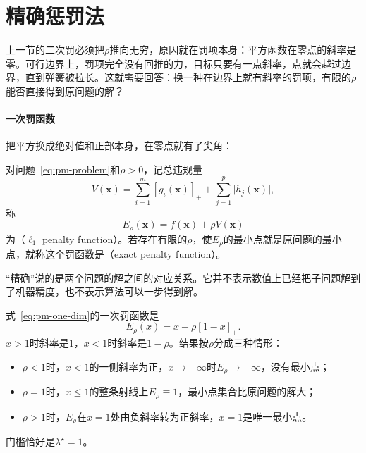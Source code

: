 \section{精确惩罚法}
\label{sec:pm-exact}

上一节的二次罚必须把$\rho$推向无穷，原因就在罚项本身：平方函数在零点的斜率是零。可行边界上，罚项完全没有回推的力，目标只要有一点斜率，点就会越过边界，直到弹簧被拉长。这就需要回答：换一种在边界上就有斜率的罚项，有限的$\rho$能否直接得到原问题的解？

\paragraph{一次罚函数}
把平方换成绝对值和正部本身，在零点就有了尖角：

\begin{definition}[一次罚函数]
\label{def:pm-exact-penalty}
对问题~\eqref{eq:pm-problem}和$\rho>0$，记总违规量
\begin{equation}
 V(\bm{x})=\sum_{i=1}^m[g_i(\bm{x})]_++\sum_{j=1}^p\lvert h_j(\bm{x})\rvert ,
 \label{eq:pm-total-violation}
\end{equation}
称
\begin{equation}
 E_\rho(\bm{x})=f(\bm{x})+\rho V(\bm{x})
 \label{eq:pm-exact-penalty}
\end{equation}
为（$\ell_1$ penalty function）。若存在有限的$\rho$，使$E_\rho$的最小点就是原问题的最小点，就称这个罚函数是（exact penalty function）。
\end{definition}

“精确”说的是两个问题的解之间的对应关系。它并不表示数值上已经把子问题解到了机器精度，也不表示算法可以一步得到解。

\begin{example}[一维例的一次罚]
\label{ex:pm-exact-one-dim}
式~\eqref{eq:pm-one-dim}的一次罚函数是
\[
 E_\rho(x)=x+\rho[1-x]_+ .
\]
$x>1$时斜率是$1$，$x<1$时斜率是$1-\rho$。结果按$\rho$分成三种情形：
\begin{itemize}
 \item $\rho<1$时，$x<1$的一侧斜率为正，$x\to-\infty$时$E_\rho\to-\infty$，没有最小点；
 \item $\rho=1$时，$x\leq1$的整条射线上$E_\rho\equiv1$，最小点集合比原问题的解大；
 \item $\rho>1$时，$E_\rho$在$x=1$处由负斜率转为正斜率，$x=1$是唯一最小点。
\end{itemize}
门槛恰好是$\lambda^\star=1$。
\end{example}

